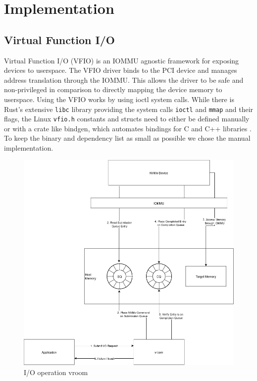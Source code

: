 \chapter{Implementation}

\section{Virtual Function I/O}
Virtual Function I/O (VFIO) is an IOMMU agnostic framework for exposing devices to userspace.
The VFIO driver binds to the PCI device and manages address translation through the IOMMU.
This allows the driver to be safe and non-privileged in comparison to directly mapping the device memory to userspace.
Using the VFIO works by using ioctl system calls.
While there is Rust's extensive \texttt{libc} library providing the system calls \texttt{ioctl} and \texttt{mmap} and their flags, the Linux \texttt{vfio.h} constants and structs need to either be defined manually or with a crate like bindgen, which automates bindings for C and C++ libraries \cite{cratebindgen}. To keep the binary and dependency list as small as possible we chose the manual implementation.

\begin{figure}
    \centering
    \includegraphics[width=\textwidth]{figures/vroomgraphlight.png}
    \caption{I/O operation vroom}
    \label{fig:vroom-graph}
\end{figure}

